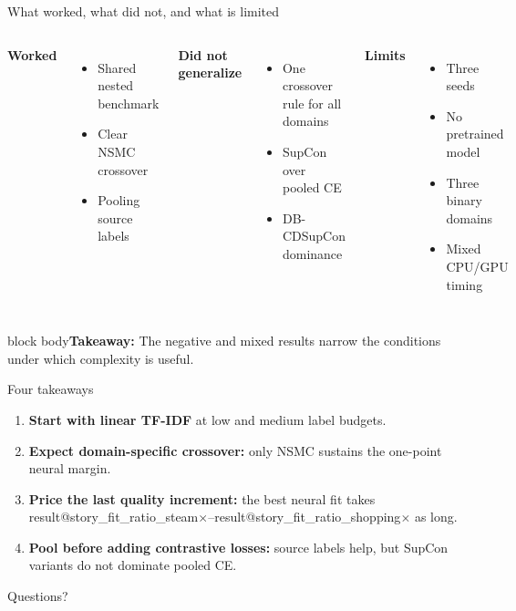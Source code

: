 \documentclass[aspectratio=169,12pt]{beamer}
\makeatletter
\newcommand{\Result}[1]{\csname result@#1\endcsname}
\newcommand{\takeaway}[1]{\vfill\begin{beamercolorbox}[sep=5pt,wd=\linewidth]{block body}\normalsize\textbf{Takeaway:} #1\end{beamercolorbox}}
\makeatother
\begin{document}
\begin{frame}{What worked, what did not, and what is limited}
  \begin{columns}[T]
    \textbf{\color{green}Worked}
    \begin{itemize}
      \item Shared nested benchmark
      \item Clear NSMC crossover
      \item Pooling source labels
    \end{itemize}
    \textbf{\color{vermillion}Did not generalize}
    \begin{itemize}
      \item One crossover rule for all domains
      \item SupCon over pooled CE
      \item DB-CDSupCon dominance
    \end{itemize}
    \textbf{Limits}
    \begin{itemize}
      \item Three seeds
      \item No pretrained model
      \item Three binary domains
      \item Mixed CPU/GPU timing
    \end{itemize}
  \end{columns}
  \takeaway{The negative and mixed results narrow the conditions under which complexity is useful.}
\end{frame}

\begin{frame}{Four takeaways}
  \begin{enumerate}
    \item \textbf{Start with linear TF-IDF} at low and medium label budgets.
    \item \textbf{Expect domain-specific crossover:} only NSMC sustains the one-point neural margin.
    \item \textbf{Price the last quality increment:} the best neural fit takes \Result{story_fit_ratio_steam}$\times$--\Result{story_fit_ratio_shopping}$\times$ as long.
    \item \textbf{Pool before adding contrastive losses:} source labels help, but SupCon variants do not dominate pooled CE.
  \end{enumerate}
  \vspace{4mm}
  \centering
  \Large Questions?
\end{frame}
\end{document}
